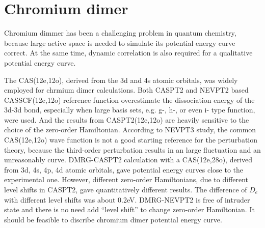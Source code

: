\section{Chromium dimer}

Chromium dimmer has been a challenging problem in quantum chemistry, because large active space is needed to simulate its potential energy curve correct. At the same time, dynamic correlation is also required for a qualitative potential energy curve. \cite{andersson_cr2_1994,roos_multiconfigurational_1995,roos_multiconfigurational_1996,roos_ground_2003,angeli_third-order_2006,muller_large-scale_2009,kurashige_second-order_2011,sharma_multireference_2015}

The CAS(12e,12o), derived from the 3d and 4s atomic orbitals, was widely employed for chrmium dimer calculations.\cite{andersson_cr2_1994,roos_multiconfigurational_1995,roos_multiconfigurational_1996,angeli_third-order_2006,muller_large-scale_2009,sharma_multireference_2015} Both CASPT2\cite{andersson_cr2_1994,roos_multiconfigurational_1995,roos_multiconfigurational_1996} and NEVPT2\cite{angeli_n-electron_2001} based CASSCF(12e,12o) reference function overestimate the dissociation energy of the 3d-3d bond, especially when large basis sets, e.g. g-, h-, or even i- type function, were used.\cite{celani_cipt2_2004,angeli_third-order_2006} And the results from CASPT2(12e,12o) are heavily sensitive to the choice of the zero-order Hamiltonian.\cite{celani_cipt2_2004,ruiperez_complete_2011}
According to NEVPT3 study,\cite{angeli_third-order_2006} the common CAS(12e,12o) wave function is not a good starting reference for the perturbation theory, because the third-order perturbation results in an large fluctuation and an unreasonably curve. DMRG-CASPT2 calculation with a CAS(12e,28o), derived from 3d, 4s, 4p, 4d atomic orbitals, gave potential energy curves close to the experimental one. However, different zero-order Hamiltonians, due to different level shifts in CASPT2, gave quantitatively different results. The difference of $D_e$ with different level shifts was about 0.2eV.
\cite{kurashige_second-order_2011}
DMRG-NEVPT2 is free of intruder state and there is no need add ``level shift'' to change zero-order Hamiltonian. It should be feasible to discribe chromium dimer potential energy curve.

